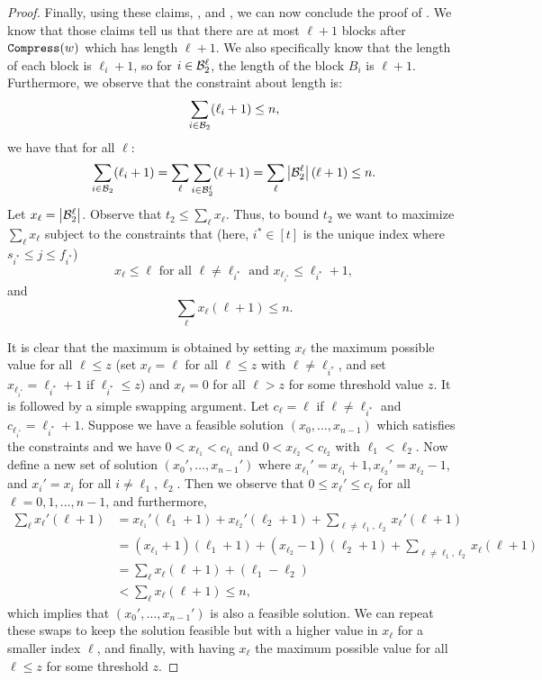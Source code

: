 \begin{proof}
Finally, using these claims, ,  and ,  we can now conclude the proof of . We know that those claims tell us that there are at most $\ell+1$ blocks after $\mathtt{Compress}(w)$ which has length $\ell+1$. We also specifically know that the length of each block is $\ell_i+1$, so for $i\in{\ensuremath{\mathcal{B}}}_2^\ell$, the length of the block $B_i$ is $\ell+1$. Furthermore, we observe that the constraint about length is:
\[\sum_{i\in{\ensuremath{\mathcal{B}}}_2} (\ell_i+1)\leq n,\]
we have that for all $\ell$:
\[\sum_{i\in{\ensuremath{\mathcal{B}}}_2} (\ell_i+1) = \sum_\ell \sum_{i\in{\ensuremath{\mathcal{B}}}_2^\ell} (\ell+1) = \sum_\ell \left| {\mathcal{B}}_2^\ell \right| (\ell+1) \leq n.\]
Let $x_\ell = \left| {\mathcal{B}}_2^\ell\right|$. Observe that $t_2 \leq \sum_\ell x_\ell$. Thus, to bound $t_2$ we want to maximize $\sum_\ell x_\ell$ subject to the constraints that (here, $i^*\in[t]$ is the unique index where $s_{i^*}\leq j\leq f_{i^*}$)
\[x_\ell \leq \ell\text{ for all }\ell\neq\ell_{i^*}\text{ and }x_{\ell_{i^*}}\leq \ell_{i^*}+1,\]
and
\[\sum_\ell x_\ell  (\ell+1) \leq n.\]

It is clear that the maximum is obtained by setting $x_\ell$ the maximum possible value for all $\ell \leq z$ (set $x_\ell=\ell$ for all $\ell\leq z$ with $\ell\neq\ell_{i^*}$, and set $x_{\ell_{i^*}}=\ell_{i^*}+1$ if $\ell_{i^*}\leq z$) and $x_{\ell}=0$ for all $\ell > z$ for some threshold value $z$. It is followed by a simple swapping argument. Let $c_\ell=\ell$ if $\ell\neq\ell_{i^*}$ and $c_{\ell_{i^*}}=\ell_{i^*}+1$. Suppose we have a feasible solution $(x_0,\ldots,x_{n-1})$ which satisfies the constraints and we have $0<x_{\ell_1}<c_{\ell_1}$ and $0<x_{\ell_2}<c_{\ell_2}$ with $\ell_1<\ell_2$. Now define a new set of solution $(x_0',\ldots,x_{n-1}')$ where $x_{\ell_1}'=x_{\ell_1}+1, x_{\ell_2}'=x_{\ell_2}-1$, and $x_i'=x_i$ for all $i\neq \ell_1,\ell_2$. Then we observe that $0\leq x_\ell'\leq c_\ell$ for all $\ell=0,1,\ldots,n-1$, and furthermore,
\begin{align*}
    \sum_\ell x_\ell'(\ell+1) &= x_{\ell_1}'(\ell_1+1) + x_{\ell_2}'(\ell_2+1) + \sum_{\ell\neq\ell_1,\ell_2} x_\ell'(\ell+1)\\
    &= (x_{\ell_1}+1)(\ell_1+1) + (x_{\ell_2}-1)(\ell_2+1) + \sum_{\ell\neq\ell_1,\ell_2} x_\ell(\ell+1)\\
    &= \sum_\ell x_\ell(\ell+1) + (\ell_1-\ell_2) \\
    &< \sum_\ell x_\ell(\ell+1) \leq n,
\end{align*}
which implies that $(x_0',\ldots,x_{n-1}')$ is also a feasible solution. We can repeat these swaps to keep the solution feasible but with a higher value in $x_\ell$ for a smaller index $\ell$, and finally, with having $x_\ell$ the maximum possible value for all $\ell\leq z$ for some threshold $z$.


\end{proof}
